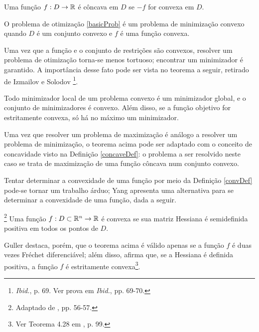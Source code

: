 \begin{definition}
Uma fun\c{c}\~{a}o $f: D \to \mathbb{R}$ \'{e} c\^{o}ncava em $D$ se $-f$ for convexa em $D$.
\end{definition}

\begin{definition}\label{concaveDef}
O problema de otimiza\c{c}\~{a}o \eqref{basicProb} \'{e} um problema de minimiza\c{c}\~{a}o convexo quando $D$ \'{e} um conjunto convexo e $f$ \'{e} uma fun\c{c}\~{a}o convexa.
\end{definition}

Uma vez que a fun\c{c}\~{a}o e o conjunto de restri\c{c}\~{o}es s\~{a}o convexos, resolver um problema de otimiza\c{c}\~{a}o torna-se menos tortuoso; encontrar um minimizador \'{e} garantido. A import\^{a}ncia desse fato pode ser vista no teorema a seguir, retirado de Izmailov e Solodov \footnote{\textit{Ibid.}, p. 69. Ver prova em \textit{Ibid.}, pp. 69-70.}.

\begin{theorem}
Todo minimizador local de um problema convexo \'{e} um minimizador global, e o conjunto de minimizadores \'{e} convexo. Al\'{e}m disso, se a fun\c{c}\~{a}o objetivo for estritamente convexa, s\'{o} h\'{a} no m\'{a}ximo um minimizador.
\end{theorem}

Uma vez que resolver um problema de maximiza\c{c}\~{a}o \'{e} an\'{a}logo a resolver um problema de minimiza\c{c}\~{a}o, o teorema acima pode ser adaptado com o conceito de concavidade visto na Defini\c{c}\~{a}o \ref{concaveDef}: o problema a ser resolvido neste caso se trata de maximiza\c{c}\~{a}o de uma fun\c{c}\~{a}o c\^{o}ncava num conjunto convexo.

Tentar determinar a convexidade de uma fun\c{c}\~{a}o por meio da Defini\c{c}\~{a}o \ref{convDef} pode-se tornar um trabalho \'{a}rduo; Yang apresenta uma alternativa para se determinar a convexidade de uma fun\c{c}\~{a}o, dada a seguir.

\begin{theorem}\footnote{Adaptado de \cite{yang}, pp. 56-57.}
Uma fun\c{c}\~{a}o $f: D \subset \mathbb{R}^{n} \to \mathbb{R}$ \'{e} convexa se sua matriz Hessiana \'{e} semidefinida positiva em todos os pontos de $D$.
\end{theorem}

Guller destaca, por\'{e}m, que o teorema acima \'{e} v\'{a}lido apenas se a fun\c{c}\~{a}o $f$ \'{e} duas vezes Fr\'{e}chet diferenci\'{a}vel; al\'{e}m disso, afirma que, se a Hessiana \'{e} definida positiva, a fun\c{c}\~{a}o $f$ \'{e} estritamente convexa\footnote{Ver Teorema 4.28 em \cite{guller}, p. 99.}.


